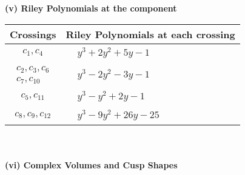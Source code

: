 \documentclass[1p]{elsarticle_modified}
\theoremstyle{definition}
\begin{document}
\newpage\renewcommand{\arraystretch}{1}
\flushleft \textbf{(v) Riley Polynomials at the component}\newline \\
\begin{tabular}{m{50pt}|m{274pt}}
Crossings & \hspace{64pt}Riley Polynomials at each crossing \\
\hline $$\begin{aligned}c_{1},c_{4}\end{aligned}$$&$\begin{aligned}
&y^3+2 y^2+5 y-1
\end{aligned}$\\
\hline $$\begin{aligned}c_{2},c_{3},c_{6}\\c_{7},c_{10}\end{aligned}$$&$\begin{aligned}
&y^3-2 y^2-3 y-1
\end{aligned}$\\
\hline $$\begin{aligned}c_{5},c_{11}\end{aligned}$$&$\begin{aligned}
&y^3- y^2+2 y-1
\end{aligned}$\\
\hline $$\begin{aligned}c_{8},c_{9},c_{12}\end{aligned}$$&$\begin{aligned}
&y^3-9 y^2+26 y-25
\end{aligned}$\\
\hline
\end{tabular}\\~\\
\newpage\flushleft \textbf{(vi) Complex Volumes and Cusp Shapes}
\end{document}
